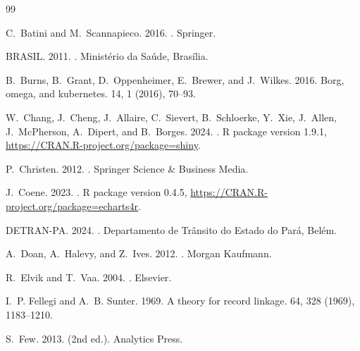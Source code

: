 \documentclass[sigconf, nonacm, screen, language=portuguese, language=spanish, language={main=english}]{acmart}
\begin{document}

\begin{thebibliography}{99}

C.~Batini and M.~Scannapieco. 2016.
.
\newblock Springer.

BRASIL. 2011.
.
\newblock Ministério da Saúde, Brasília.

B.~Burns, B.~Grant, D.~Oppenheimer, E.~Brewer, and J.~Wilkes. 2016.
\newblock Borg, omega, and kubernetes.
 14, 1 (2016), 70--93.

W.~Chang, J.~Cheng, J.~Allaire, C.~Sievert, B.~Schloerke, Y.~Xie, J.~Allen, J.~McPherson, A.~Dipert, and B.~Borges. 2024.
.
\newblock R package version 1.9.1, \url{https://CRAN.R-project.org/package=shiny}.

P.~Christen. 2012.
.
\newblock Springer Science \& Business Media.

J.~Coene. 2023.
.
\newblock R package version 0.4.5, \url{https://CRAN.R-project.org/package=echarts4r}.

DETRAN-PA. 2024.
.
\newblock Departamento de Trânsito do Estado do Pará, Belém.

A.~Doan, A.~Halevy, and Z.~Ives. 2012.
.
\newblock Morgan Kaufmann.

R.~Elvik and T.~Vaa. 2004.
.
\newblock Elsevier.

I.~P. Fellegi and A.~B. Sunter. 1969.
\newblock A theory for record linkage.
 64, 328 (1969), 1183--1210.

S.~Few. 2013.
 (2nd ed.).
\newblock Analytics Press.


\end{thebibliography}
\end{document}
